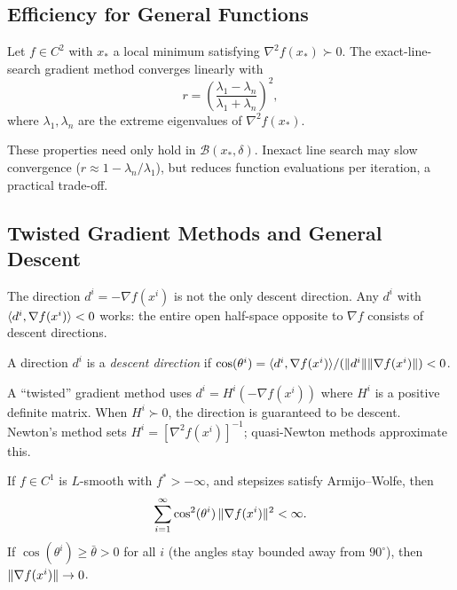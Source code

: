 \subsection{Efficiency for General Functions}\label{sec:efficiency-general}

\begin{theorem}\label{thm:grad-general}
	Let $f \in C^2$ with $x_*$ a local minimum satisfying $\nabla^2 f(x_*) \succ 0$.
	The exact-line-search gradient method converges linearly with
	\begin{equation}\label{eq:local-convergence-rate}
		r = \left(\frac{\lambda_1 - \lambda_n}{\lambda_1 + \lambda_n}\right)^{\!2},
	\end{equation}
	where $\lambda_1, \lambda_n$ are the extreme eigenvalues of $\nabla^2 f(x_*)$.
\end{theorem}

These properties need only hold in $\mathcal{B}(x_*, \delta)$.
Inexact line search may slow convergence ($r \approx 1 - \lambda_n/\lambda_1$), but reduces function evaluations per iteration, a practical trade-off.


\subsection{Twisted Gradient Methods and General Descent}\label{sec:twisted-descent}

The direction $d^i = -\nabla f(x^i)$ is not the only descent direction.
Any $d^i$ with $\langle d^i, \nabla f(x^i)\rangle < 0$ works: the entire open half-space opposite to $\nabla f$ consists of descent directions.

\begin{definition}\label{def:descent-dir}
	A direction $d^i$ is a \emph{descent direction} if $\cos(\theta^i) = \langle d^i, \nabla f(x^i)\rangle / (\lVert d^i\rVert \lVert\nabla f(x^i)\rVert) < 0$.
\end{definition}

A ``twisted'' gradient method uses $d^i = H^i(-\nabla f(x^i))$ where $H^i$ is a positive definite matrix.
When $H^i \succ 0$, the direction is guaranteed to be descent.
Newton's method sets $H^i = [\nabla^2 f(x^i)]^{-1}$; quasi-Newton methods approximate this.

\begin{theorem}\label{thm:zoutendijk}
	If $f \in C^1$ is $L$-smooth with $f^* > -\infty$, and stepsizes satisfy Armijo--Wolfe, then
	\begin{equation}\label{eq:zoutendijk}
		\sum_{i=1}^{\infty} \cos^2(\theta^i)\, \lVert\nabla f(x^i)\rVert^2 < \infty.
	\end{equation}
	If $\cos(\theta^i) \geq \bar{\theta} > 0$ for all $i$ (the angles stay bounded away from $90^\circ$), then $\lVert\nabla f(x^i)\rVert \to 0$.
\end{theorem}

